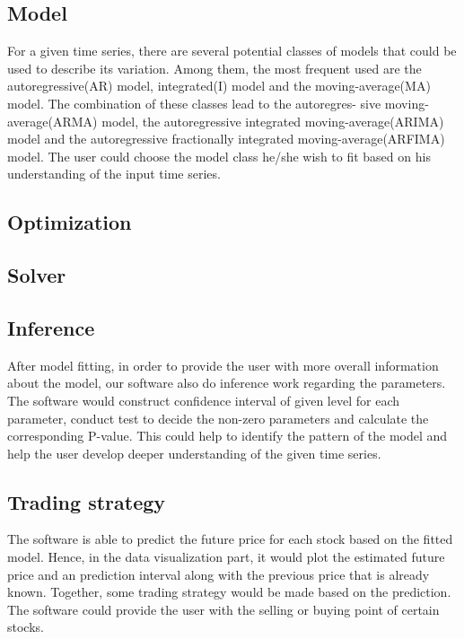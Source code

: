 \documentclass[12pt,a4paper]{article}
\begin{document}
\subsection{Model}
For a given time series, there are several potential classes of models that could be used to describe its variation. Among them, the most frequent used are the autoregressive(AR) model, integrated(I) model and the moving-average(MA) model. The combination of these classes lead to the autoregres- sive moving-average(ARMA) model, the autoregressive integrated moving-average(ARIMA) model and the autoregressive fractionally integrated moving-average(ARFIMA) model. The user could choose the model class he/she wish to fit based on his understanding of the input time series.

\subsection{Optimization}



\subsection{Solver}


\subsection{Inference}
After model fitting, in order to provide the user with more overall information about the model, our software also do inference work regarding the parameters. The software would construct confidence interval of given level for each parameter, conduct test to decide the non-zero parameters and calculate the corresponding P-value. This could help to identify the pattern of the model and help the user develop deeper understanding of the given time series.

\subsection{Trading strategy}
The software is able to predict the future price for each stock based on the fitted model. Hence, in the data visualization part, it would plot the estimated future price and an prediction interval along with the previous price that is already known. Together, some trading strategy would be made based on the prediction. The software could provide the user with the selling or buying point of certain stocks.
\end{document}
